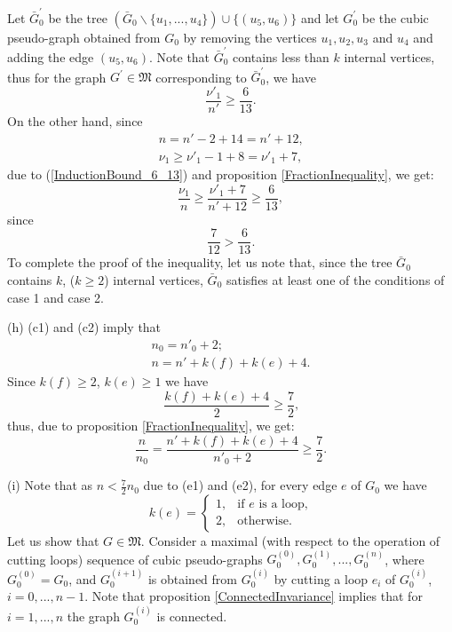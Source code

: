\documentclass[fleqn,12pt,twoside]{article}
\newenvironment{proof}[1][Proof.]{\begin{trivlist}
\item[\hskip \labelsep {\bfseries #1}]}{\end{trivlist}}
\begin{document}
\begin{proof}
Let $\bar{G}_{0}^{\prime }$ be the tree $(\bar{G}_{0}\backslash
\{u_{1},...,u_{4}\})\cup \{(u_{5},u_{6})\}$ and let $G_{0}^{\prime
}$ be the
cubic pseudo-graph obtained from $G_{0}$ by removing the vertices $u_{1},u_{2},u_{3}$ and $u_{4}$ and adding the edge $(u_{5},u_{6})$.
Note that $\bar{G}_{0}^{\prime }$ contains less than $k$ internal
vertices, thus
for the graph $G^{\prime }\in \mathfrak{M}$ corresponding to $\bar{G}_{0}^{\prime }$, we have
\begin{equation}
\frac{\nu' _{1}}{n'}\geq \frac{6}{13}.
\label{InductionBound_6_13_Second}
\end{equation}On the other hand, since
\begin{gather*}
n =n'-2+14=n'+12\text{,} \\
\nu _{1}\geq \nu' _{1}-1+8=\nu' _{1}+7,
\end{gather*}due to (\ref{InductionBound_6_13}) and proposition
\ref{FractionInequality}, we get:
\begin{equation*}
\frac{\nu _{1}}{n}\geq \frac{\nu' _{1}+7}{n'+12}\geq \frac{6}{13},
\end{equation*}since
\begin{equation*}
\frac{7}{12}>\frac{6}{13}.
\end{equation*}To complete the proof of the inequality, let us note that, since the tree $\bar{G}_{0}$ contains $k$, ($k\geq 2$) internal vertices,
$\bar{G}_{0}$ satisfies at least one of the conditions of case 1 and
case 2.

(h) (c1) and (c2) imply that
\begin{gather*}
n_0=n'_0 +2;
\\
n =n' +k(f)+k(e)+4\text{.}
\end{gather*}
Since $k(f)\geq 2$, $k(e)\geq 1$ we have
\begin{equation*}
\frac{k(f)+k(e)+4}{2}\geq \frac{7}{2}\text{,}
\end{equation*}thus, due to proposition \ref{FractionInequality}, we get:\begin{equation*}
\frac{n}{n_0}=\frac{n'+k(f)+k(e)+4}{n'_0 +2}\geq \frac{7}{2}\text{.}
\end{equation*}

(i) Note that as $n <\frac{7}{2}n_0$ due to (e1) and (e2), for every
edge $e$
of $G_{0}$ we have\begin{equation*}
k(e)=\left\{
\begin{array}{ll}
1, & \text{if }e\text{ is a loop,} \\
2, & \text{otherwise.}\end{array}\right.
\end{equation*}Let us show that $G\in \mathfrak{M}$. Consider a maximal (with
respect to
the operation of cutting loops) sequence of cubic pseudo-graphs $G_{0}^{(0)},G_{0}^{(1)},...,G_{0}^{(n)}$, where $G_{0}^{(0)}=G_{0}$, and $G_{0}^{(i+1)}$ is obtained from $G_{0}^{(i)}$ by cutting a loop $e_{i}$ of $G_{0}^{(i)}$,$i=0,...,n-1$. Note that proposition
\ref{ConnectedInvariance} implies that for $i=1,...,n$ the graph
$G_{0}^{(i)}$ is connected.


\end{proof}
\end{document}

